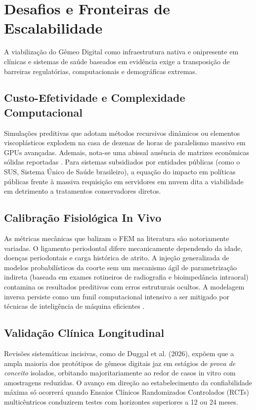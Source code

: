 \section{Desafios e Fronteiras de Escalabilidade}
\label{sec:desafios}

A viabilização do Gêmeo Digital como infraestrutura nativa e onipresente em clínicas e sistemas de saúde baseados em evidência exige a transposição de barreiras regulatórias, computacionais e demográficas extremas.

\subsection{Custo-Efetividade e Complexidade Computacional}
Simulações preditivas que adotam métodos recursivos dinâmicos ou elementos viscoplásticos explodem na casa de dezenas de horas de paralelismo massivo em GPUs avançadas. Ademais, nota-se uma abissal ausência de matrizes econômicas sólidas reportadas \cite{duggal2026exploring}. Para sistemas subsidiados por entidades públicas (como o SUS, Sistema Único de Saúde brasileiro), a equação do impacto em políticas públicas frente à massiva requisição em servidores em nuvem dita a viabilidade em detrimento a tratamentos conservadores diretos.

\subsection{Calibração Fisiológica In Vivo}
As métricas mecânicas que balizam o FEM na literatura são notoriamente variadas. O ligamento periodontal difere mecanicamente dependendo da idade, doenças periodontais e carga histórica de atrito. A injeção generalizada de modelos probabilísticos da coorte sem um mecanismo ágil de parametrização indireta (baseada em exames rotineiros de radiografia e bioimpedância intraoral) contamina os resultados preditivos com erros estruturais ocultos. A modelagem inversa persiste como um funil computacional intensivo a ser mitigado por técnicas de inteligência de máquina eficientes \cite{olawade2026advancing}.

\subsection{Validação Clínica Longitudinal}
Revisões sistemáticas incisivas, como de Duggal et al. (2026), expõem que a ampla maioria dos protótipos de gêmeos digitais jaz em estágios de \textit{prova de conceito} isolados, orbitando majoritariamente ao redor de casos in vitro com amostragens reduzidas. O avanço em direção ao estabelecimento da confiabilidade máxima só ocorrerá quando Ensaios Clínicos Randomizados Controlados (RCTs) multicêntricos conduzirem testes com horizontes superiores a 12 ou 24 meses.

